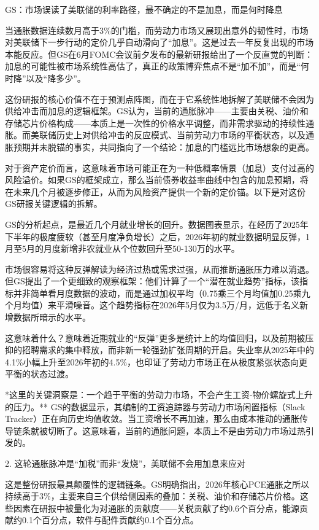 \documentclass[11pt]{ctexart}
\begin{document}
GS：市场误读了美联储的利率路径，最不确定的不是加息，而是何时降息

当通胀数据连续数月高于3\%的门槛，而劳动力市场又展现出意外的韧性时，市场对美联储下一步行动的定价几乎自动滑向了“加息”。这是过去一年反复出现的市场本能反应。但GS在6月FOMC会议前夕发布的最新研报给出了一个反直觉的判断：加息的可能性被市场系统性高估了，真正的政策博弈焦点不是“加不加”，而是“何时降”以及“降多少”。

这份研报的核心价值不在于预测点阵图，而在于它系统性地拆解了美联储不会因为供给冲击而加息的逻辑框架。GS认为，当前的通胀脉冲——主要由关税、油价和存储芯片价格构成——本质上是一次性的价格水平调整，而非需求驱动的持续性通胀。而美联储历史上对供给冲击的反应模式、当前劳动力市场的平衡状态，以及通胀预期并未脱锚的事实，共同指向了一个结论：加息的门槛远比市场想象的更高。

对于资产定价而言，这意味着市场可能正在为一种低概率情景（加息）支付过高的风险溢价。如果GS的框架成立，那么当前债券收益率曲线中包含的加息预期，将在未来几个月被逐步修正，从而为风险资产提供一个新的定价锚。以下是对这份GS研报关键逻辑的拆解。

GS的分析起点，是最近几个月就业增长的回升。数据图表显示，在经历了2025年下半年的极度疲软（甚至月度净负增长）之后，2026年初的就业数据明显反弹，1月至5月的月度新增非农就业从个位数回升至50-130万的水平。

市场很容易将这种反弹解读为经济过热或需求过强，从而推断通胀压力难以消退。但GS提出了一个更细致的观察框架：他们计算了一个“潜在就业趋势”指标，该指标并非简单看月度数据的波动，而是通过加权平均（0.75乘三个月均值加0.25乘九个月均值）来平滑噪音。这个趋势指标在2026年5月仅为3.5万/月，远低于名义新增数据所暗示的水平。

这意味着什么？意味着近期就业的“反弹”更多是统计上的均值回归，以及前期被压抑的招聘需求的集中释放，而非新一轮强劲扩张周期的开启。失业率从2025年中的4.1\%小幅上升至2026年初的4.5\%，也印证了劳动力市场正在从极度紧张状态向更平衡的状态过渡。

*这里的关键洞察是：一个趋于平衡的劳动力市场，不会产生工资-物价螺旋式上升的压力。** GS的数据显示，其编制的工资追踪器与劳动力市场闲置指标（Slack Tracker）正在向历史均值收敛。当工资增长不再加速，那么由成本推动的通胀传导链条就被切断了。这意味着，当前的通胀问题，本质上不是由劳动力市场过热引发的。

2. 这轮通胀脉冲是“加税”而非“发烧”，美联储不会用加息来应对

这是整份研报最具颠覆性的逻辑链条。GS明确指出，2026年核心PCE通胀之所以持续高于3\%，主要来自三个供给侧因素的叠加：关税、油价和存储芯片价格。这些因素在研报中被量化为对通胀的贡献度——关税贡献了约0.6个百分点，能源贡献约0.1个百分点，软件与配件贡献约0.1个百分点。
\end{document}
